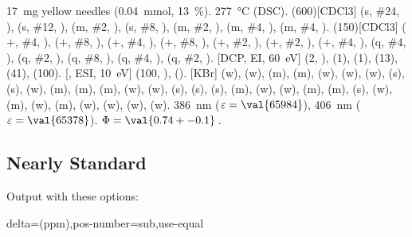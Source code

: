 \documentclass{chemmacros-manual}
\begin{document}
\begin{sourcecode}
  \begin{experimental}[<optionen>]
     \SI{17}{\milli\gram} yellow needles (\SI{0.04}{\milli\mole},
      \SI{13}{\percent}).
     \SI{277}{\celsius} (DSC).
    \NMR(600)[CDCl3]  (s, \#{24}, ),  (s, \#{12},
    ),  (m, \#{2}, ),  (s, \#{8},
    ),  (m, \#{2}, ),  (m, \#{4},
    ),  (m, \#{4}, ).
    (150)[CDCl3]  ($+$, \#{4}, ),  ($+$,
    \#{8}, ),  ($+$, \#{4}, ),  ($+$, \#{8},
    ),  ($+$, \#{2}, ),  ($+$, \#{2},
    ),  ($+$, \#{4}, ),  (q, \#{4},
    ),  (q, \#{2}, ),  (q, \#{8}, ),
     (q, \#{4}, ),  (q, \#{2}, ).
    [DCP, EI, \SI{60}{\electronvolt}]  (2, ), 
    (1),  (1),  (13),  (41),  (100).
    [, ESI, \SI{10}{\electronvolt}]  (100,
    ),  ().
    [KBr]  (w),  (w),  (m), 
    (m),  (w),  (w),  (w),  (s),
     (s),  (w),  (m),  (m), 
    (m),  (w),  (w),  (s),  (s),
     (s),  (m),  (w),  (w), 
    (m),  (m),  (s),  (w),  (m), 
    (w),  (m),  (w),  (w),  (w), 
    (w).
     \SI{386}{\nano\metre} ($\varepsilon = \val{65984}$),
    \SI{406}{\nano\metre} ($\varepsilon = \val{65378}$).
     $\Phi = \val{0.74+-0.1}$\,.
  \end{experimental}
\end{sourcecode}

\subsection{Nearly Standard}
Output with these options:

\begin{sourcecode}
  delta=(ppm),pos-number=sub,use-equal
\end{sourcecode}
\end{document}
